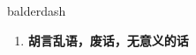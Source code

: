
\begin{frame}
{\huge balderdash}
\begin{center}
\begin{enumerate}\Large
  \item \textbf{胡言乱语，废话，无意义的话}
\end{enumerate}
\end{center}
\end{frame}
